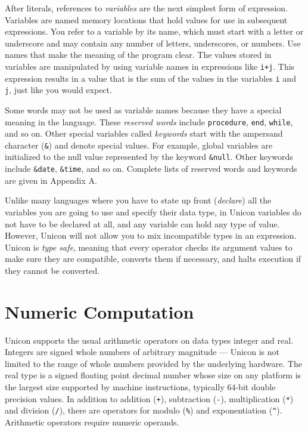 After literals, references to
\textit{variable}\textit{s} are the next simplest form
of expression. Variables are named memory locations that hold values
for use in subsequent expressions. You refer to a variable by its name,
which must start with a letter or underscore and may contain any number
of letters, underscores, or numbers. Use names that make the meaning of
the program clear. The values stored in variables are manipulated by
using variable names in expressions like \texttt{i+j}. This expression
results in a value that is the sum of the values in the variables
\texttt{i} and \texttt{j}, just like you would expect.

Some words may not be used as variable names because they have a special
meaning in the language. These \textit{reserved
words} include \texttt{procedure}, \texttt{end},
\texttt{while}, and so on. Other special variables called
\textit{keywords} start with the ampersand
character (\texttt{\&}) and denote special values. For example, global
variables are initialized to the null value represented by the keyword
\texttt{\&null}. Other keywords
include \texttt{\&date}, \texttt{\&time}, and so on.
Complete lists of reserved words and keywords are given in Appendix A.

Unlike many languages where you have to state up front
(\textit{declare}) all the variables you are going to use\textit{ }and
specify their data type, in Unicon variables do not have to be declared
at all, and any variable can hold any type of value. However, Unicon
will not allow you to mix incompatible types in an expression. Unicon
is \textit{type safe}, meaning that every operator
checks its argument values to make sure they are compatible, converts
them if necessary, and halts execution if they cannot be converted.

\section{Numeric Computation}

Unicon supports the usual arithmetic operators on
data types integer and real. Integers are
signed whole numbers of arbitrary magnitude --- Unicon is not limited
to the range of whole numbers provided by the underlying hardware.
The real type is a signed
floating point decimal number whose size on any
platform is the largest size supported by machine instructions,
typically 64-bit double precision values. In addition to
addition (\texttt{+}), subtraction
(\texttt{{}-}), multiplication (\texttt{*}) and
division (\texttt{/}), there are operators for
modulo (\texttt{\%}) and exponentiation (\texttt{\^{}}). Arithmetic operators require
numeric operands.

